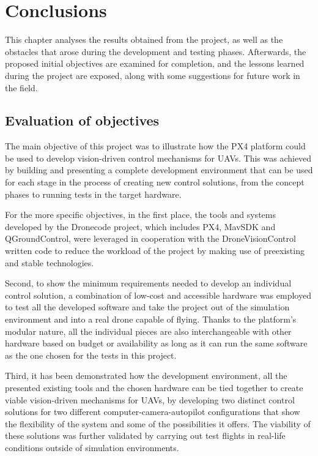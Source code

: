 \chapter{Conclusions}
\label{chap:conclusion}

This chapter analyses the results obtained from the project, as well as the obstacles that arose during the development and testing phases.
Afterwards, the proposed initial objectives are examined for completion, and the lessons learned during the project are exposed, along with some suggestions for future work in the field.

\section{Evaluation of objectives}
\label{sec:consecucion-objetivos}

The main objective of this project was to illustrate how the PX4 platform could be used to develop vision-driven control mechanisms for UAVs.
This was achieved by building and presenting a complete development environment that can be used for each stage in the process of creating new control solutions, from the concept phases to running tests in the target hardware.

For the more specific objectives, in the first place,
the tools and systems developed by the Dronecode project, which includes PX4, MavSDK and QGroundControl, were leveraged in cooperation with the DroneVisionControl written code to reduce the workload of the project by making use of preexisting and stable technologies.

Second, to show the minimum requirements needed to develop an individual control solution, a combination of low-cost and accessible hardware was employed to test all the developed software and take the project out of the simulation environment and into a real drone capable of flying.
Thanks to the platform's modular nature, all the individual pieces are also interchangeable with other hardware based on budget or availability as long as it can run the same software as the one chosen for the tests in this project.

Third, it has been demonstrated how the development environment, all the presented existing tools and the chosen hardware can be tied together to create viable vision-driven mechanisms for UAVs, 
by developing two distinct control solutions for two different computer-camera-autopilot configurations that show the flexibility of the system and some of the possibilities it offers.
The viability of these solutions was further validated by carrying out test flights in real-life conditions outside of simulation environments.

